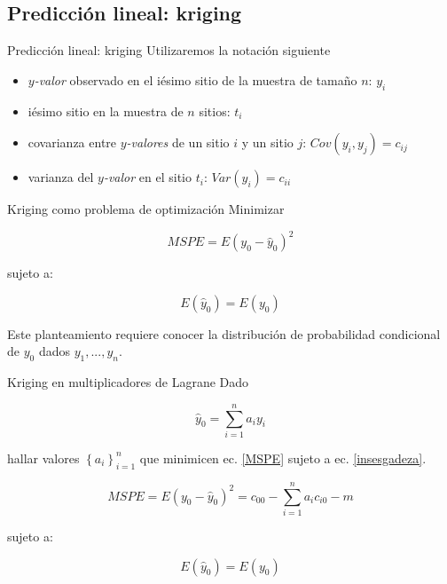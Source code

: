 \documentclass[12pts]{beamer}
\begin{document}
	\subsection{Predicción lineal: kriging}
	\begin{frame}{Predicción lineal: kriging}
		Utilizaremos la notación siguiente
		\begin{itemize}
			\item \textit{$y$-valor} observado en el iésimo sitio de la muestra de tamaño $n$: $y_i$
			\item iésimo sitio en la muestra de $n$ sitios: $t_i$
			\item covarianza entre \textit{$y$-valores} de un sitio $i$ y un sitio $j$: $Cov(y_i, y_j) = c_{ij}$
			\item varianza del \textit{$y$-valor} en el sitio $t_i$: $Var(y_i) = c_{ii}$	
		\end{itemize}
	\end{frame}

	\begin{frame}{Kriging como problema de optimización}
		Minimizar
		
		\begin{equation}
		MSPE = E\left(y_0 - \hat{y}_0\right)^2\label{MSPE}
		\end{equation}
		
		sujeto a:
		
		\begin{equation}
		E\left(\hat{y}_0\right) = E\left(y_0\right)\label{insesgadeza}
		\end{equation}
		
		Este planteamiento requiere conocer la distribución de probabilidad condicional de $y_0$ dados $y_1, ..., y_n$.
	\end{frame}

	\begin{frame}{Kriging en multiplicadores de Lagrane}
		Dado 
		
		\begin{equation}
		\hat{y}_0 = \sum_{i=1}^{n} a_i y_i\label{blup}
		\end{equation}
		
		\noindent hallar valores $\left\lbrace a_i \right\rbrace_{i=1}^{n}$ que minimicen ec. \ref{MSPE} sujeto a ec. \ref{insesgadeza}. 
		
		\begin{equation*}
		MSPE = E\left(y_0 - \hat{y}_0\right)^2= c_{00} - \sum_{i=1}^{n}a_i c_{i0} - m\label{MSPE_kriging}%
		\end{equation*}
		
		sujeto a:
		
		\begin{equation*}
		E\left(\hat{y}_0\right) = E\left(y_0\right)%
		\end{equation*}
	\end{frame}
\end{document}
